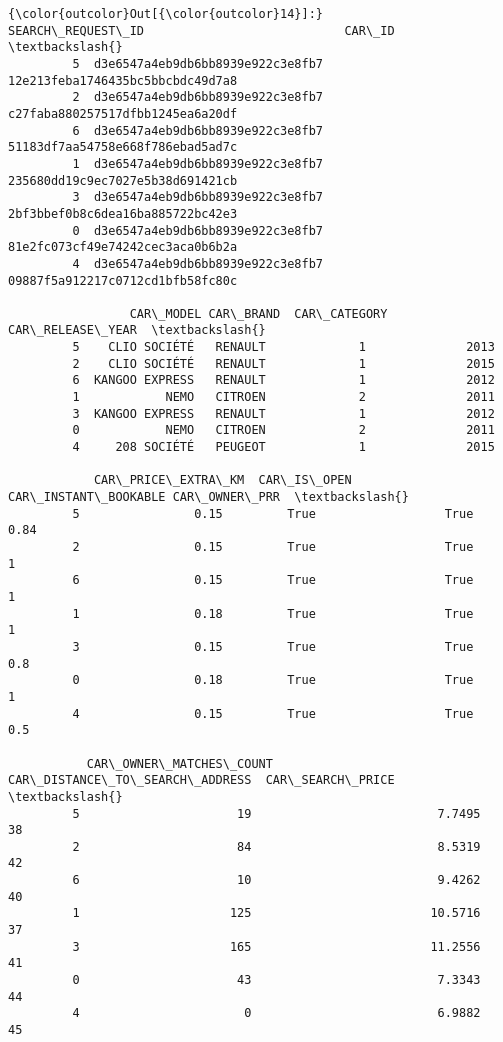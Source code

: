 \documentclass[11pt]{article}
\begin{document}
\begin{Verbatim}[commandchars=\\\{\}]
{\color{outcolor}Out[{\color{outcolor}14}]:}                   SEARCH\_REQUEST\_ID                            CAR\_ID  \textbackslash{}
         5  d3e6547a4eb9db6bb8939e922c3e8fb7  12e213feba1746435bc5bbcbdc49d7a8   
         2  d3e6547a4eb9db6bb8939e922c3e8fb7  c27faba880257517dfbb1245ea6a20df   
         6  d3e6547a4eb9db6bb8939e922c3e8fb7  51183df7aa54758e668f786ebad5ad7c   
         1  d3e6547a4eb9db6bb8939e922c3e8fb7  235680dd19c9ec7027e5b38d691421cb   
         3  d3e6547a4eb9db6bb8939e922c3e8fb7  2bf3bbef0b8c6dea16ba885722bc42e3   
         0  d3e6547a4eb9db6bb8939e922c3e8fb7  81e2fc073cf49e74242cec3aca0b6b2a   
         4  d3e6547a4eb9db6bb8939e922c3e8fb7  09887f5a912217c0712cd1bfb58fc80c   
         
                 CAR\_MODEL CAR\_BRAND  CAR\_CATEGORY  CAR\_RELEASE\_YEAR  \textbackslash{}
         5    CLIO SOCIÉTÉ   RENAULT             1              2013   
         2    CLIO SOCIÉTÉ   RENAULT             1              2015   
         6  KANGOO EXPRESS   RENAULT             1              2012   
         1            NEMO   CITROEN             2              2011   
         3  KANGOO EXPRESS   RENAULT             1              2012   
         0            NEMO   CITROEN             2              2011   
         4     208 SOCIÉTÉ   PEUGEOT             1              2015   
         
            CAR\_PRICE\_EXTRA\_KM  CAR\_IS\_OPEN  CAR\_INSTANT\_BOOKABLE CAR\_OWNER\_PRR  \textbackslash{}
         5                0.15         True                  True          0.84   
         2                0.15         True                  True             1   
         6                0.15         True                  True             1   
         1                0.18         True                  True             1   
         3                0.15         True                  True           0.8   
         0                0.18         True                  True             1   
         4                0.15         True                  True           0.5   
         
           CAR\_OWNER\_MATCHES\_COUNT  CAR\_DISTANCE\_TO\_SEARCH\_ADDRESS  CAR\_SEARCH\_PRICE  \textbackslash{}
         5                      19                          7.7495                38   
         2                      84                          8.5319                42   
         6                      10                          9.4262                40   
         1                     125                         10.5716                37   
         3                     165                         11.2556                41   
         0                      43                          7.3343                44   
         4                       0                          6.9882                45   
         

\end{Verbatim}
\end{document}
